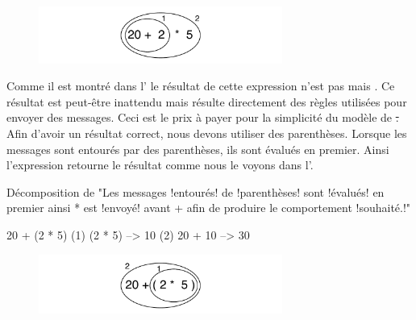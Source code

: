 \documentclass[a4paper,10pt,twoside]{book}
\begin{document}
\begin{figure}
\begin{center}\includegraphics[width=8cm]{ucompoNoBracketPar}\end{center}
\end{figure}
\noindent
Comme il est montr\'e dans l' le r\'esultat de
cette expression n'est pas  mais . Ce r\'esultat est
peut-\^etre inattendu mais r\'esulte directement des r\`egles
utilis\'ees pour envoyer des messages. Ceci est le prix \`a payer pour
la simplicit\'e du mod\`ele de \st. Afin d'avoir un r\'esultat
correct, nous devons utiliser des parenth\`eses. Lorsque les messages
sont entour\'es par des parenth\`eses, ils sont \'evalu\'es en
premier. Ainsi l'expression  retourne le r\'esultat
comme nous le voyons dans l'.

\begin{example}[mathcorrect]{D\'ecomposition de }{}
"Les messages !entour\'es! de !parenth\`eses! sont !\'evalu\'es! en premier ainsi * est !envoy\'e! avant + afin de produire le comportement !souhait\'e.!"

    20 + (2 * 5) 
(1)        (2 * 5) --> 10
(2) 20 + 10      --> 30
\end{example}

\begin{figure}
\begin{center}
\includegraphics[width=8cm]{ucompoNumberBracket}
\end{center}
\end{figure}


\end{document}
